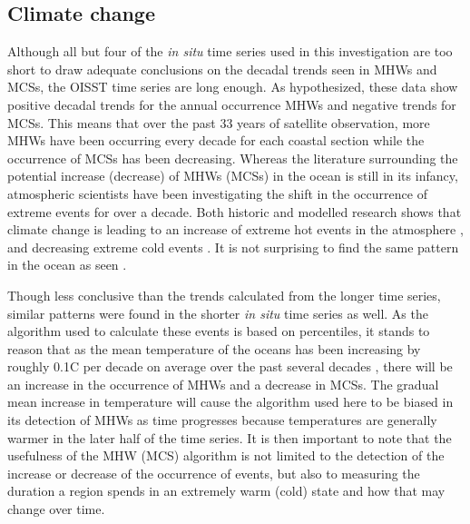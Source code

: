 \documentclass[a4paper,10pt,review]{elsarticle}
\begin{document}
\subsection{Climate change}
Although all but four of the \emph{in situ} time series used in this investigation are too short to draw adequate conclusions on the decadal trends seen in MHWs and MCSs, the OISST time series are long enough. As hypothesized, these data show positive decadal trends for the annual occurrence MHWs and negative trends for MCSs. This means that over the past 33 years of satellite observation, more MHWs have been occurring every decade for each coastal section while the occurrence of MCSs has been decreasing. Whereas the literature surrounding the potential increase (decrease) of MHWs (MCSs) in the ocean is still in its infancy, atmospheric scientists have been investigating the shift in the occurrence of extreme events for over a decade. Both historic and modelled research shows that climate change is leading to an increase of extreme hot events in the atmosphere \citep{Easterling2000, Perkins2013}, and decreasing extreme cold events \citep{Meehl2004}. It is not surprising to find the same pattern in the ocean as seen .

Though less conclusive than the trends calculated from the longer time series, similar patterns were found in the shorter \emph{in situ} time series as well. As the algorithm used to calculate these events is based on percentiles, it stands to reason that as the mean temperature of the oceans has been increasing by roughly 0.1\degree C per decade on average over the past several decades \citep{IPCC2014}, there will be an increase in the occurrence of MHWs and a decrease in MCSs. The gradual mean increase in temperature will cause the algorithm used here to be biased in its detection of MHWs as time progresses because temperatures are generally warmer in the later half of the time series. It is then important to note that the usefulness of the MHW (MCS) algorithm is not limited to the detection of the increase or decrease of the occurrence of events, but also to measuring the duration a region spends in an extremely warm (cold) state and how that may change over time.
\end{document}
